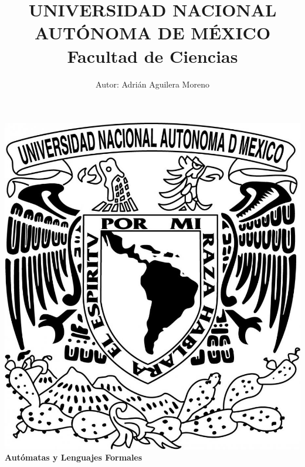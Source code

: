 \documentclass{article}
\begin{document}
\title{UNIVERSIDAD NACIONAL AUT\'ONOMA DE M\'EXICO\\ Facultad de Ciencias}
\author{Autor: Adri\'an Aguilera Moreno}
\date{}
\maketitle
\begin{center}
  \includegraphics[scale=0.20]{../Imagen/Portada.jpg}\\[0.4cm]
  \Large
  \bf{Aut\'omatas y Lenguajes Formales}
  \normalsize
\end{center}
\newpage
{}
\end{document}
